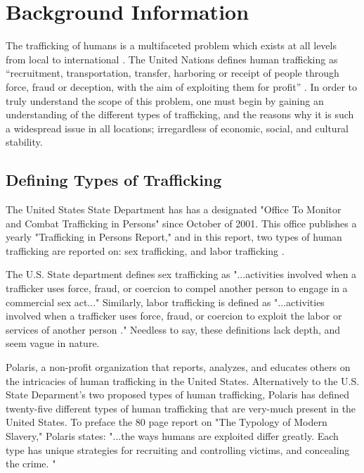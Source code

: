 \documentclass{article} %
\begin{document}
\section{Background Information}

The trafficking of humans is a multifaceted problem which exists at all levels from local to international \parencite{Aromaa2007, JacK2012}. The United Nations defines human trafficking as “recruitment, transportation, transfer, harboring or receipt of people through force, fraud or deception, with the aim of exploiting them for profit” \parencite{Raymond2002}. In order to truly understand the scope of this problem, one must begin by gaining an understanding of the different types of trafficking, and the reasons why it is such a widespread issue in all locations; irregardless of economic, social, and cultural stability.

\subsection*{Defining Types of Trafficking}

The United States State Department has has a designated "Office To Monitor and Combat Trafficking in Persons" since October of 2001. This office publishes a yearly "Trafficking in Persons Report," and in this report, two types of human trafficking are reported on: sex trafficking, and labor trafficking \parencite{StateDept}.

The U.S. State department defines sex trafficking as
"...activities involved when a trafficker uses force, fraud, or coercion to compel another person to engage in a commercial sex act..." Similarly, labor trafficking is defined as "...activities involved when a trafficker uses force, fraud, or coercion to exploit the labor or services of another person \parencite{StateDept}." Needless to say, these definitions lack depth, and seem vague in nature.

Polaris, a non-profit organization that reports, analyzes, and educates others on the intricacies of human trafficking in the United States. Alternatively to the U.S. State Deparment's two proposed types of human trafficking, Polaris has defined twenty-five different types of human trafficking that are very-much present in the United States. To preface the 80 page report on "The Typology of Modern Slavery," Polaris states: "...the ways humans are exploited differ greatly. Each type has unique strategies for recruiting and controlling victims, and concealing the crime. \parencite{polarisTypology}"
\end{document}
